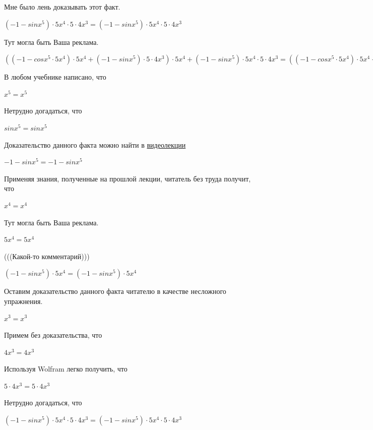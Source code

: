 \documentclass[12pt,a4paper,fleqn]{article}
\theoremstyle{definition}
\begin{document}
Мне было лень доказывать этот факт.

$( -1  - sin{ x }^{ 5 }) \cdot  5 { x }^{ 4 } \cdot  5  \cdot  4 { x }^{ 3 } = ( -1  - sin{ x }^{ 5 }) \cdot  5 { x }^{ 4 } \cdot  5  \cdot  4 { x }^{ 3 }$

Тут могла быть Ваша реклама. 

$(( -1  - cos{ x }^{ 5 } \cdot  5 { x }^{ 4 }) \cdot  5 { x }^{ 4 } + ( -1  - sin{ x }^{ 5 }) \cdot  5  \cdot  4 { x }^{ 3 }) \cdot  5 { x }^{ 4 } + ( -1  - sin{ x }^{ 5 }) \cdot  5 { x }^{ 4 } \cdot  5  \cdot  4 { x }^{ 3 } = (( -1  - cos{ x }^{ 5 } \cdot  5 { x }^{ 4 }) \cdot  5 { x }^{ 4 } + ( -1  - sin{ x }^{ 5 }) \cdot  5  \cdot  4 { x }^{ 3 }) \cdot  5 { x }^{ 4 } + ( -1  - sin{ x }^{ 5 }) \cdot  5 { x }^{ 4 } \cdot  5  \cdot  4 { x }^{ 3 }$

В любом учебнике написано, что 

${ x }^{ 5 } = { x }^{ 5 }$

Нетрудно догадаться, что 

$sin{ x }^{ 5 } = sin{ x }^{ 5 }$

Доказательство данного факта можно найти в \href{https://www.youtube.com/watch?v=dQw4w9WgXcQ}{видеолекции} 

$ -1  - sin{ x }^{ 5 } =  -1  - sin{ x }^{ 5 }$

Применяя знания, полученные на прошлой лекции, читатель без труда получит, что 

${ x }^{ 4 } = { x }^{ 4 }$

Тут могла быть Ваша реклама. 

$ 5 { x }^{ 4 } =  5 { x }^{ 4 }$

(((Какой-то комментарий))) 

$( -1  - sin{ x }^{ 5 }) \cdot  5 { x }^{ 4 } = ( -1  - sin{ x }^{ 5 }) \cdot  5 { x }^{ 4 }$

Оставим доказательство данного факта читателю в качестве несложного упражнения. 

${ x }^{ 3 } = { x }^{ 3 }$

Примем без доказательства, что 

$ 4 { x }^{ 3 } =  4 { x }^{ 3 }$

Используя Wolfram легко получить, что 

$ 5  \cdot  4 { x }^{ 3 } =  5  \cdot  4 { x }^{ 3 }$

Нетрудно догадаться, что 

$( -1  - sin{ x }^{ 5 }) \cdot  5 { x }^{ 4 } \cdot  5  \cdot  4 { x }^{ 3 } = ( -1  - sin{ x }^{ 5 }) \cdot  5 { x }^{ 4 } \cdot  5  \cdot  4 { x }^{ 3 }$
\end{document}
